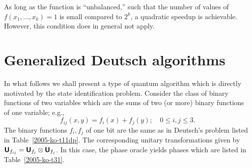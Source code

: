 As long as
the function is ``unbalanced,'' such that the
number of values of $f(x_1, \ldots ,x_k)=1$ is small compared to $2^k$,
a quadratic speedup is achievable.
However, this condition does in general not apply.

\section{Generalized Deutsch algorithms}


In what follows  we shall present a type of quantum algorithm
which is directly motivated by the state identification problem.
Consider the class of binary functions of two variables which are  the sums of
two (or more) binary functions of one variable; e.g.,
\begin{equation}
f_{ij}(x,y)=f_i(x)+f_j(y); \quad 0\le i,j\le 3.
\label{2005-ko-e31}
\end{equation}
The binary functions $f_i,f_j$ of one bit are the same as in Deutsch's problem
listed in Table~\ref{2005-ko-t11dp}.
The corresponding unitary transformations given by
$
\textsf{\textbf{U}}_{f_{ij}}=
\textsf{\textbf{U}}_{f_i}
\otimes
\textsf{\textbf{U}}_{f_j}$.
In this case,
the phase oracle  yields phases which are listed in Table~\ref{2005-ko-t31}.
